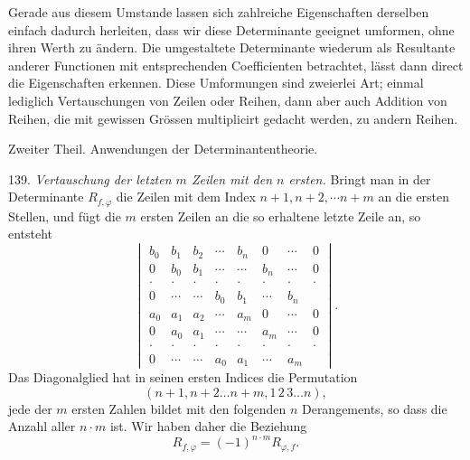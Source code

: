 \documentclass[11pt]{article}
\providecommand{\weberpage}[1]{}
\begin{document}
Gerade aus diesem Umstande lassen sich zahlreiche Eigenschaften derselben einfach dadurch herleiten, dass wir diese Determinante geeignet umformen, ohne ihren Werth zu ändern. Die umgestaltete Determinante wiederum als Resultante anderer Functionen mit entsprechenden Coefficienten betrachtet, lässt dann direct die Eigenschaften erkennen. Diese Umformungen sind zweierlei Art; einmal lediglich Vertauschungen von Zeilen oder Reihen, dann aber auch Addition von Reihen, die mit gewissen Grössen multiplicirt gedacht werden, zu andern Reihen.


\weberpage{146}

\begin{center}
Zweiter Theil. Anwendungen der Determinantentheorie.
\end{center}

139. \textit{Vertauschung der letzten $m$ Zeilen mit den $n$ ersten.} Bringt man in der Determinante $R_{f,\varphi}$ die Zeilen mit dem Index $n+1, n+2, \cdots n+m$ an die ersten Stellen, und fügt die $m$ ersten Zeilen an die so erhaltene letzte Zeile an, so entsteht
\[
\begin{vmatrix}
b_0 & b_1 & b_2 & \cdots & b_n & 0 & \cdots & 0 \\
0 & b_0 & b_1 & \cdots & \cdots & b_n & \cdots & 0 \\
\cdot & \cdot & \cdot & \cdot & \cdot & \cdot & \cdot & \cdot \\
0 & \cdots & \cdots & b_0 & b_1 & \cdots & b_n & {} \\
a_0 & a_1 & a_2 & \cdots & a_m & 0 & \cdots & 0 \\
0 & a_0 & a_1 & \cdots & \cdots & a_m & \cdots & 0 \\
\cdot & \cdot & \cdot & \cdot & \cdot & \cdot & \cdot & \cdot \\
0 & \cdots & \cdots & a_0 & a_1 & \cdots & a_m & {}
\end{vmatrix}.
\]
Das Diagonalglied hat in seinen ersten Indices die Permutation
\[
(n+1, n+2 \ldots n+m, 1\,2\,3 \ldots n),
\]
jede der $m$ ersten Zahlen bildet mit den folgenden $n$ Derangements, so dass die Anzahl aller $n\cdot m$ ist. Wir haben daher die Beziehung
\[
R_{f,\varphi} = (-1)^{n\cdot m} R_{\varphi,f}.
\]
\end{document}
